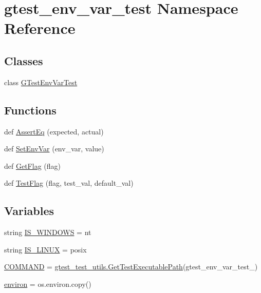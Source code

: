 \hypertarget{namespacegtest__env__var__test}{}\section{gtest\+\_\+env\+\_\+var\+\_\+test Namespace Reference}
\label{namespacegtest__env__var__test}
\subsection*{Classes}
\begin{DoxyCompactItemize}
\item 
class \hyperlink{classgtest__env__var__test_1_1_g_test_env_var_test}{G\+Test\+Env\+Var\+Test}
\end{DoxyCompactItemize}
\subsection*{Functions}
\begin{DoxyCompactItemize}
\item 
def \hyperlink{namespacegtest__env__var__test_a8c94a5abd1117cdd2b402c0059a49a3a}{Assert\+Eq} (expected, actual)
\item 
def \hyperlink{namespacegtest__env__var__test_a634ee0fa1ccf4713411992e7373e49e9}{Set\+Env\+Var} (env\+\_\+var, value)
\item 
def \hyperlink{namespacegtest__env__var__test_a79d5f78f47c7dde37a0941d8604cf857}{Get\+Flag} (flag)
\item 
def \hyperlink{namespacegtest__env__var__test_aa7bb6bbb50ba35349bbdae6d881faee8}{Test\+Flag} (flag, test\+\_\+val, default\+\_\+val)
\end{DoxyCompactItemize}
\subsection*{Variables}
\begin{DoxyCompactItemize}
\item 
string \hyperlink{namespacegtest__env__var__test_af792d1403a09d46bffcd3466821cd0fb}{I\+S\+\_\+\+W\+I\+N\+D\+O\+WS} = \textquotesingle{}nt\textquotesingle{}
\item 
string \hyperlink{namespacegtest__env__var__test_a33b1e2e9afe9d59d75503de4a1297486}{I\+S\+\_\+\+L\+I\+N\+UX} = \textquotesingle{}posix\textquotesingle{}
\item 
\hyperlink{namespacegtest__env__var__test_a36e02e39934750d022966df31c568a53}{C\+O\+M\+M\+A\+ND} = \hyperlink{namespacegtest__test__utils_a89ed3717984a80ffbb7a9c92f71b86a2}{gtest\+\_\+test\+\_\+utils.\+Get\+Test\+Executable\+Path}(\textquotesingle{}gtest\+\_\+env\+\_\+var\+\_\+test\+\_\+\textquotesingle{})
\item 
\hyperlink{namespacegtest__env__var__test_ac671a59c1b805f7e9511e91380865cda}{environ} = os.\+environ.\+copy()
\end{DoxyCompactItemize}



